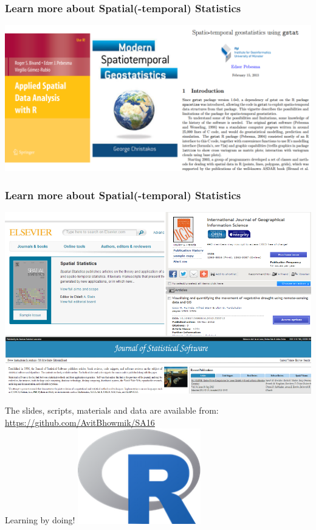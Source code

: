 \documentclass{beamer}
\begin{document}
\begin{frame}
\frametitle{Learn more about Spatial(-temporal) Statistics}
\centering
\includegraphics[width=\textwidth]{Figures/books.png}
\end{frame}


\begin{frame}
\frametitle{Learn more about Spatial(-temporal) Statistics}
\centering
\includegraphics[width=\textwidth]{Figures/journals.png}
\end{frame}


\begin{frame}
\centering
The slides, scripts, materials and data are available from:\\
\href{https://github.com/AvitBhowmik/SA16}{\alert{https://github.com/AvitBhowmik/SA16}}\\
\vspace{1cm}
\Huge Learning by doing!
\includegraphics[width=0.4\textwidth]{Figures/Rlogo.png}
\end{frame}
\end{document}
